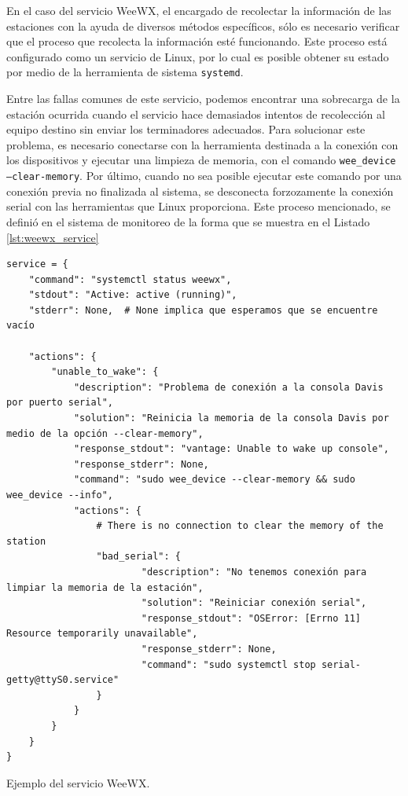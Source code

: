 En el caso del servicio WeeWX, el encargado de recolectar la información de las estaciones con la ayuda de diversos métodos específicos, sólo es necesario verificar que el proceso que recolecta la información esté funcionando. Este proceso está configurado como un servicio de Linux, por lo cual es posible obtener su estado por medio de la herramienta de sistema \texttt{systemd}.

Entre las fallas comunes de este servicio, podemos encontrar una sobrecarga de la estación ocurrida cuando el servicio hace demasiados intentos de recolección al equipo destino sin enviar los terminadores adecuados. Para solucionar este problema, es necesario conectarse con la herramienta destinada a la conexión con los dispositivos y ejecutar una limpieza de memoria, con el comando \texttt{wee\_device --clear-memory}. Por último, cuando no sea posible ejecutar este comando por una conexión previa no finalizada al sistema, se desconecta forzozamente la conexión serial con las herramientas que Linux proporciona. Este proceso mencionado, se definió en el sistema de monitoreo de la forma que se muestra en el Listado \ref{lst:weewx_service}

\begin{listing}
\begin{verbatim}
service = {
    "command": "systemctl status weewx",
    "stdout": "Active: active (running)",
    "stderr": None,  # None implica que esperamos que se encuentre vacío

    "actions": {
        "unable_to_wake": {
            "description": "Problema de conexión a la consola Davis por puerto serial",
            "solution": "Reinicia la memoria de la consola Davis por medio de la opción --clear-memory",
            "response_stdout": "vantage: Unable to wake up console",
            "response_stderr": None,
            "command": "sudo wee_device --clear-memory && sudo wee_device --info",
            "actions": {
                # There is no connection to clear the memory of the station
                "bad_serial": {
                        "description": "No tenemos conexión para limpiar la memoria de la estación",
                        "solution": "Reiniciar conexión serial",
                        "response_stdout": "OSError: [Errno 11] Resource temporarily unavailable",
                        "response_stderr": None,
                        "command": "sudo systemctl stop serial-getty@ttyS0.service"
                }
            }
        }
    }
}
\end{verbatim}
\caption{Ejemplo del servicio WeeWX.}
\label{lst:weewx_service}
\end{listing}

